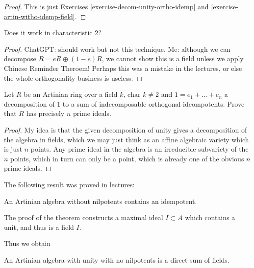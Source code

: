 \begin{proof}
This is just
Exercises
\ref{exercise-decom-unity-ortho-idemp}
and \ref{exercise-artin-witho-idemp-field}.
\end{proof}

\begin{exercise}
\label{exercise-decomposition-char2}
Does it work in characteristic 2?
\end{exercise}

\begin{proof}
ChatGPT: should work but not this
technique.
Me: although we can decompose
$R = eR \oplus(1-e)R$,
we cannot show this is a field
unless we apply Chinese Reminder
Theroem! Perhaps this was a
mistake in the lectures,
or else the whole orthogonality
business is useless.
\end{proof}

\begin{exercise}
\label{exercise-n-prime-ideals}
Let $R$ be an Artinian ring over
a field $k$, $\text{char }k \neq 2$
and $1=e_1+…+e_n$ a decomposition
of 1 to a sum of indecomposable
orthogonal ideompotents.
Prove that $R$ has precisely $n$
prime ideals.
\end{exercise}

\begin{proof}
My idea is that the given
decomposition of unity gives a
decomposition of the algebra in
fields, which we may just think as an
affine algebraic variety which is
just $n$ points.
Any prime ideal in the algebra
is an irreducible subvariety
of the $n$ points,
which in turn can only be a point,
which is already one of the
obvious $n$ prime ideals.
\end{proof}

\medskip\noindent
The following result was proved
in lectures:

\begin{theorem}
\label{theorem-reduc-artin-conta-idemp}
An Artinian algebra without
nilpotents contains an idempotent.
\end{theorem}

\noindent
The proof of the theorem constructs
a maximal ideal $I \subset A$
which contains a unit, and thus is
a field $I$.

Thus we obtain

\begin{theorem}
\label{theorem-semisimple-decomposition}
An Artinian algebra with unity with
no nilpotents
is a direct sum of fields.
\end{theorem}

